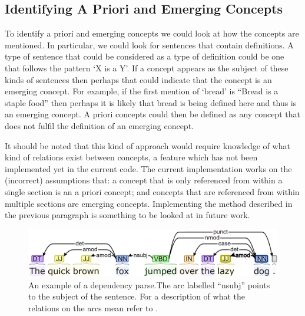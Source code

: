 \documentclass[12pt]{article}
\theoremstyle{grammarstyle}
\begin{document}

\subsection{Identifying A Priori and Emerging Concepts} \label{sec:classifying_concepts}
 To identify a priori and emerging concepts we could look at how the concepts are mentioned. In particular, we could look for sentences that contain definitions. A type of sentence that could be considered as a type of definition could be one that follows the pattern `X is a Y'. If a concept appears as the subject of these kinds of sentences then perhaps that could indicate that the concept is an emerging concept. For example, if the first mention of ‘bread’ is ``Bread is a staple food'' then perhaps it is likely that bread is being defined here and thus is an emerging concept. A priori concepts could then be defined as any concept that does not fulfil the definition of an emerging concept.
 
 It should be noted that this kind of approach would require knowledge of what kind of relations exist between concepts, a feature which has not been implemented yet in the current code. The current implementation works on the (incorrect) assumptions that: a concept that is only referenced from within a single section is an a priori concept; and concepts that are referenced from within multiple sections are emerging concepts. Implementing the method described in the previous paragraph is something to be looked at in future work. 

\begin{figure}
    \centering
    \includegraphics[width=\linewidth]{reports/technical_report/latex/figures/dependency_parse.png}
    \caption{An example of a dependency parse.\protect\footnotemark The arc labelled ``nsubj'' points to the subject of the sentence.
    For a description of what the relations on the arcs mean refer to \citep{martin2018speech}.}
    \label{fig:dependency_parse_example}
\end{figure}
\end{document}
